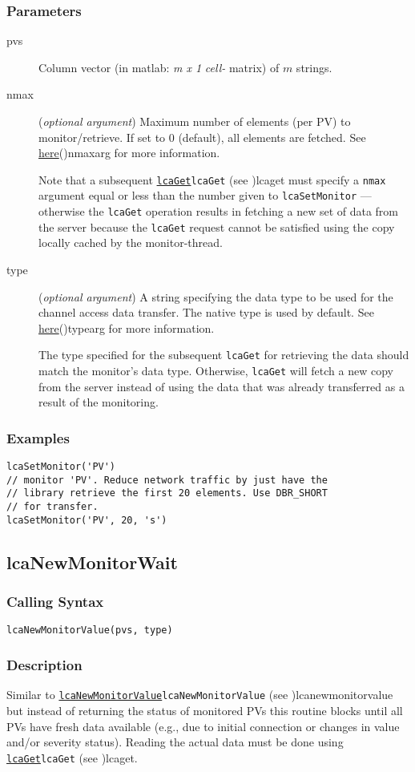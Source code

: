 \documentclass{article}
\newcommand{\com}[1]{{\tt #1}}
\newcommand{\pbrk}{\pagebreak[3]}
\newcommand{\comref}[2]{\hyperref[ref]{\com{#1}}{\com{#1} (see }{)}{#2}}
\newcommand{\ita}[1]{\emph{#1}}
\newcommand{\m}{$m$}
\newcommand{\mhack}{$m$} %
\newcommand{\mxl}{$m\times 1$}
\renewcommand{\m}{\ita{m}}
\newcommand{\mhack}{\ita{m}} %
\renewcommand{\mxl}{\ita{m x 1}}
\renewcommand{\pbrk}{}
\newcommand{\PVITEM}{
\item[pvs] Column vector (in matlab: \mxl{} \ita{cell-} matrix)
of \mhack{} strings.
}
\begin{document}
\subsubsection{Parameters}
\begin{description}
\PVITEM
\item[nmax]
(\ita{optional argument}) Maximum number of elements
(per PV) to monitor/retrieve. If set to 0 (default), all elements are fetched.
See \hyperref[ref]{here}{(}{)}{nmaxarg} for more information.

Note that a subsequent \comref{lcaGet}{lcaget} must specify a \com{nmax}
argument equal or less than the number given to \com{lcaSetMonitor} ---
otherwise the \com{lcaGet} operation results in fetching a new
set of data from the server because the \com{lcaGet} request cannot
be satisfied using the copy locally cached by the monitor-thread.
\item[type]
(\ita{optional argument}) A string specifying the
data type to be used for the channel access data transfer. The
native type is used by default.
See \hyperref[ref]{here}{(}{)}{typearg} for more information.

The type specified for the subsequent \com{lcaGet} for retrieving
the data should match the monitor's data type. Otherwise, \com{lcaGet}
will fetch a new copy from the server instead of using the data that
was already transferred as a result of the monitoring.
\end{description}
\subsubsection{Examples}
\begin{verbatim}
lcaSetMonitor('PV')
// monitor 'PV'. Reduce network traffic by just have the
// library retrieve the first 20 elements. Use DBR_SHORT
// for transfer.
lcaSetMonitor('PV', 20, 's')
\end{verbatim}

\pbrk
\subsection{lcaNewMonitorWait}
\label{lcanewmonitorwait}
\subsubsection{Calling Syntax}
\begin{verbatim}
lcaNewMonitorValue(pvs, type)
\end{verbatim}
\subsubsection{Description}
Similar to \comref{lcaNewMonitorValue}{lcanewmonitorvalue} but instead of
returning the status of monitored PVs this routine blocks until all PVs
have fresh data available (e.g., due to initial connection or changes in
value and/or severity status).
Reading the actual data must be done using \comref{lcaGet}{lcaget}.
\end{document}
